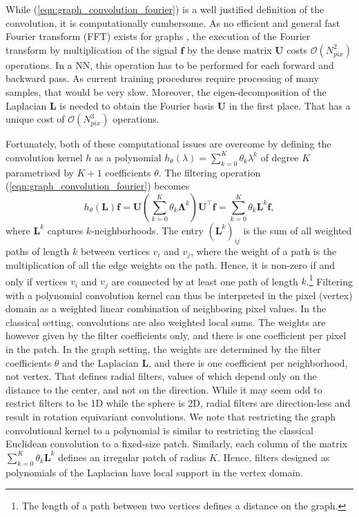 \documentclass[final,twocolumn,3p,times,sort&compress]{elsarticle}
\newcommand{\eqnref}[1]{(\ref{eqn:#1})}
\renewcommand{\b}[1]{{\bm{#1}}}   %
\newcommand{\1}{\b{1}}              %
\newcommand{\0}{\b{0}}              %
\renewcommand{\L}{\b{L}}
\newcommand{\U}{\b{U}}
\newcommand{\f}{\b{f}}
\newcommand{\trans}{^\intercal}
\newcommand{\bLambda}{\b{\Lambda}}
\newcommand{\bO}{\mathcal{O}}
\begin{document}
While \eqnref{graph_convolution_fourier} is a well justified definition of the convolution, it is computationally cumbersome.
As no efficient and general fast Fourier transform (FFT) exists for graphs \citep{le2018fgft}, the execution of the Fourier transform by multiplication of the signal $\f$ by the dense matrix $\U$ costs $\bO(N_{pix}^2)$ operations.
In a NN, this operation has to be performed for each forward and backward pass.
As current training procedures require processing of many samples, that would be very slow.
Moreover, the eigen-decomposition of the Laplacian $\L$ is needed to obtain the Fourier basis $\U$ in the first place.
That has a unique cost of $\bO(N_{pix}^3)$ operations.

Fortunately, both of these computational issues are overcome by defining the convolution kernel $h$ as a polynomial $h_\theta(\lambda) = \sum_{k=0}^K \theta_k \lambda^k$ of degree $K$ parametrised by $K+1$ coefficients $\theta$.
The filtering operation \eqnref{graph_convolution_fourier} becomes
\begin{equation} \label{eqn:graph_convolution_monomial}
	h_\theta(\L) \f =  \U \left(\sum_{k=0}^K \theta_k \bLambda^k \right) \U\trans \f = \sum_{k=0}^K \theta_k \L^k \f,
\end{equation}
where $\L^k$ captures $k$-neighborhoods.
The entry $(\L^k)_{ij}$ is the sum of all weighted paths of length $k$ between vertices $v_i$ and $v_j$, where the weight of a path is the multiplication of all the edge weights on the path.
Hence, it is non-zero if and only if vertices $v_i$ and $v_j$ are connected by at least one path of length $k$.\footnote{The length of a path between two vertices defines a distance on the graph.}
Filtering with a polynomial convolution kernel can thus be interpreted in the pixel (vertex) domain as a weighted linear combination of neighboring pixel values.
In the classical setting, convolutions are also weighted local sums.
The weights are however given by the filter coefficients only, and there is one coefficient per pixel in the patch.
In the graph setting, the weights are determined by the filter coefficients $\theta$ and the Laplacian $\L$, and there is one coefficient per neighborhood, not vertex.
That defines radial filters, values of which depend only on the distance to the center, and not on the direction.
While it may seem odd to restrict filters to be 1D while the sphere is 2D, radial filters are direction-less and result in rotation equivariant convolutions.
We note that restricting the graph convolutional kernel to a polynomial is similar to restricting the classical Euclidean convolution to a fixed-size patch.
Similarly, each column of the matrix $\sum_{k=0}^K \theta_k \L^k$ defines an irregular patch of radius $K$.
Hence, filters designed as polynomials of the Laplacian have local support in the vertex domain.
\end{document}
